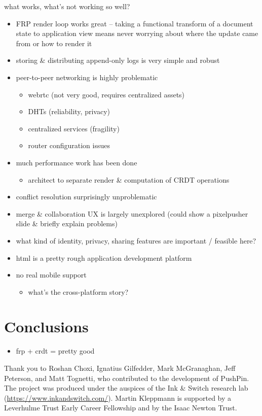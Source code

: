 \documentclass[sigplan,10pt]{acmart}
\begin{document}
what works, what's not working so well?

\begin{itemize}
    \item FRP render loop works great -- taking a functional transform of a document state to application view means never worrying about where the update came from or how to render it
	\item storing \& distributing append-only logs is very simple and robust
    \item peer-to-peer networking is highly problematic
    \begin{itemize}
	    \item webrtc (not very good, requires centralized assets)
		\item DHTs (reliability, privacy)
		\item centralized services (fragility)
		\item router configuration issues
	\end{itemize}
	\item much performance work has been done
	\begin{itemize}
	    \item architect to separate render \& computation of CRDT operations
	\end{itemize}
	\item conflict resolution surprisingly unproblematic
	\item merge \& collaboration UX is largely unexplored (could show a pixelpusher slide \& briefly explain problems)
	\item what kind of identity, privacy, sharing features are important / feasible here?
	\item html is a pretty rough application development platform
	\item no real mobile support
	\begin{itemize}
	    \item what's the cross-platform story?
	\end{itemize}
\end{itemize}

\section{Conclusions}
\begin{itemize}
	\item frp + crdt = pretty good
\end{itemize}

\begin{acks}
Thank you to Roshan Choxi, Ignatius Gilfedder, Mark McGranaghan, Jeff Peterson, and Matt Tognetti, who contributed to the development of PushPin.
The project was produced under the auspices of the Ink \& Switch research lab (\url{https://www.inkandswitch.com/}).
Martin Kleppmann is supported by a Leverhulme Trust Early Career Fellowship and by the Isaac Newton Trust.
\end{acks}


{}
\end{document}
